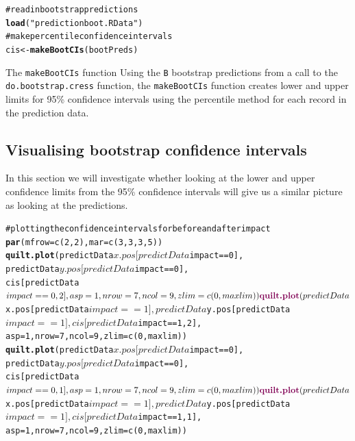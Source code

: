 \documentclass[11pt, a4paper]{article}
\makeatletter
\newcommand{\hlfunctioncall}[1]{\textcolor[rgb]{0.501960784313725,0,0.329411764705882}{\textbf{#1}}}%
\newcommand{\hlcomment}[1]{\textcolor[rgb]{0.180392156862745,0.6,0.341176470588235}{#1}}%
\newenvironment{kframe}{%
 \def\at@end@of@kframe{}%
 \ifinner\ifhmode%
  \def\at@end@of@kframe{\end{minipage}}%
  \begin{minipage}{\columnwidth}%
 \fi\fi%
 \def\FrameCommand##1{\hskip\@totalleftmargin \hskip-\fboxsep
 \colorbox{shadecolor}{##1}\hskip-\fboxsep
     \hskip-\linewidth \hskip-\@totalleftmargin \hskip\columnwidth}%
 \MakeFramed {\advance\hsize-\width
   \@totalleftmargin\z@ \linewidth\hsize
   \@setminipage}}%
 {\par\unskip\endMakeFramed%
 \at@end@of@kframe}
\newenvironment{knitrout}{}{} %
\makeatother
\begin{document}
\begin{knitrout}\footnotesize
{}\color{fgcolor}\begin{kframe}
\begin{alltt}
\hlcomment{# read in bootstrap predictions}
\hlfunctioncall{load}("predictionboot.RData")
\hlcomment{# make percentile confidence intervals}
cis <- \hlfunctioncall{makeBootCIs}(bootPreds)
\end{alltt}
\end{kframe}
\end{knitrout}
\begin{block}{The {\tt makeBootCIs} function}
Using the {\tt B} bootstrap predictions from a call to the {\tt do.bootstrap.cress} function, the {\tt makeBootCIs} function creates lower and upper limits for 95\% confidence intervals using the percentile method for each record in the prediction data. \\
\end{block}


\pagebreak
\subsection{Visualising bootstrap confidence intervals}
In this section we will investigate whether looking at the lower and upper confidence limits from the 95\% confidence intervals will give us a similar picture as looking at the predictions. 
\begin{knitrout}\footnotesize
{}\color{fgcolor}\begin{kframe}
\begin{alltt}
\hlcomment{# plotting the confidence intervals for before and after impact}
\hlfunctioncall{par}(mfrow=c(2,2), mar=c(3,3,3,5))
\hlfunctioncall{quilt.plot}(predictData$x.pos[predictData$impact==0], 
predictData$y.pos[predictData$impact==0], 
cis[predictData$impact==0,2], asp=1, nrow=7, ncol=9, 
zlim=c(0, maxlim))
\hlfunctioncall{quilt.plot}(predictData$x.pos[predictData$impact==1], 
predictData$y.pos[predictData$impact==1], cis[predictData$impact==1,2], 
asp=1,nrow=7, ncol=9, zlim=c(0, maxlim))
\hlfunctioncall{quilt.plot}(predictData$x.pos[predictData$impact==0], 
predictData$y.pos[predictData$impact==0], 
cis[predictData$impact==0,1], asp=1, nrow=7, ncol=9, 
zlim=c(0, maxlim))
\hlfunctioncall{quilt.plot}(predictData$x.pos[predictData$impact==1], 
predictData$y.pos[predictData$impact==1], cis[predictData$impact==1,1], 
asp=1,nrow=7, ncol=9, zlim=c(0, maxlim))
\end{alltt}
\end{kframe}
\end{knitrout}
\end{document}
